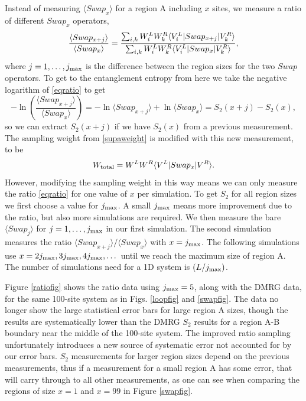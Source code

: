 Instead of measuring  $\langle Swap_x \rangle$ for a region A including $x$ sites, we measure a ratio of different $Swap_x$ operators,
\begin{equation}
\label{eqratio}
\frac{\langle Swap_{x+j}\rangle}{\langle Swap_{x}\rangle} = 
\frac{ \sum_{i,k} W^L_i W^R_k \langle {V^L_i} \rvert Swap_{x+j} \lvert {V^R_k} \rangle}
							{\sum_{i,k} W^L_i W_k^R \langle {V^L_i} \rvert Swap_x \lvert { V^R_k} \rangle},
\end{equation}
where $j=1,\dots,j_{\rm max}$ is the difference between the region sizes for the two $Swap$ operators.
To get to the entanglement entropy from here we take the negative logarithm of \eqref{eqratio} to get
\begin{equation}
\label{eqratio2}
-\ln\left( \frac{\langle Swap_{x+j}\rangle}{\langle Swap_{x}\rangle} \right) = 
-\ln \langle Swap_{x+j}\rangle + \ln\langle Swap_{x}\rangle   =   S_2(x+j) - S_2(x),
\end{equation}
so we can extract $S_2(x+j)$ if we have $S_2(x)$ from a previous measurement.
The sampling weight from \eqref{supaweight} is modified with this new measurement, to be
\begin{equation}
W_{\rm total} = W^LW^R\langle {V^L} \rvert Swap_x \lvert {V^R} \rangle.
\end{equation}
However, modifying the sampling weight in this way means we can only measure the ratio \eqref{eqratio} for one value of $x$ per simulation.
To get $S_2$ for all region sizes we first choose a value for $j_{\rm max}$.
A small $j_{\rm max}$ means more improvement due to the ratio, but also more simulations are required.
We then measure the bare $\langle Swap_{j}\rangle$ for $j=1,\dots,j_{\rm max}$ in our first simulation.
The second simulation measures the ratio $\langle Swap_{x+j}\rangle / \langle Swap_{x}\rangle$ with $x=j_{\rm max}$.  The following simulations use $x=2j_{\rm max}, 3j_{\rm max}, 4j_{\rm max}, \dots$ until we reach the maximum size of region A.
The number of simulations need for a 1D system is $(L/j_{\rm max})$.

Figure \ref{ratiofig} shows the ratio data using $j_{\rm max} = 5$, along with the DMRG data, for the same 100-site system as in Figs. \ref{loopfig} and \ref{swapfig}. 
The data no longer show the large statistical error bars for large region A sizes, though the results are systematically lower than the DMRG $S_2$ results for a region A-B boundary near the middle of the 100-site system.  
The improved ratio sampling unfortunately introduces a new source of systematic error not accounted for by our error bars.  
$S_2$ measurements for larger region sizes depend on the previous measurements, thus if a measurement for a small region A has some error, that will carry through to all other measurements, as one can see when comparing the regions of size $x=1$ and $x=99$ in Figure \ref{swapfig}.

